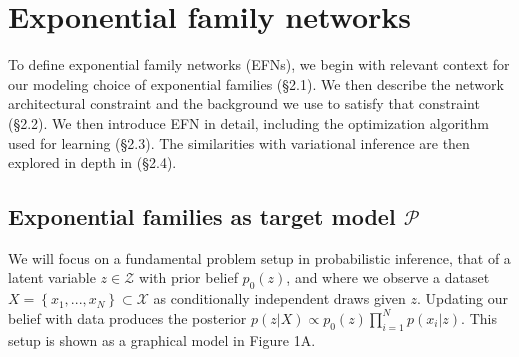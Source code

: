 \documentclass{article}
\begin{document}
\section{Exponential family networks}

To define exponential family networks (EFNs), we begin with relevant context for our modeling choice of exponential families (\S2.1).  We then describe the network architectural constraint and the background we use to satisfy that constraint (\S2.2). We then introduce EFN in detail, including the optimization algorithm used for learning (\S2.3).  The similarities with variational inference are then explored in depth in (\S2.4).

\subsection{Exponential families as target model $\mathcal{P}$}

We will focus on a fundamental problem setup in probabilistic inference, that of a latent variable $z \in \mathcal{Z}$ with prior belief $p_0(z)$, and where we observe a dataset $X = \left\{x_1,...,x_N\right\} \subset \mathcal{X}$ as conditionally independent draws given $z$.   Updating our belief with data produces the posterior $p(z | X) \propto p_0(z) \prod_{i=1}^N p(x_i | z)$.  This setup is shown as a graphical model in Figure 1A.
\end{document}

